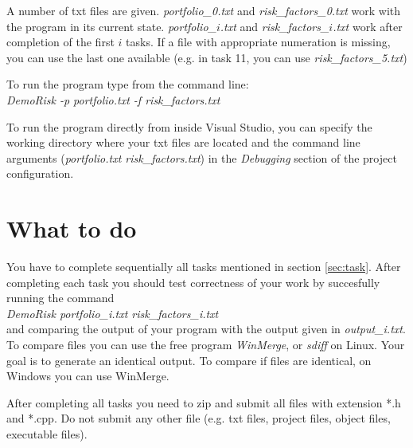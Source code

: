 \documentclass[10pt]{article}
\begin{document}
A number of txt files are given. \textit{portfolio\_0.txt} and \textit{risk\_factors\_0.txt} work with the program in its current state. \textit{portfolio\_$i$.txt} and \textit{risk\_factors\_$i$.txt} work after completion of the first $i$ tasks. If a file with appropriate numeration is missing, you can use the last one available (e.g. in task 11, you can use \textit{risk\_factors\_5.txt})

To run the program type from the command line:\\
\textit{DemoRisk -p portfolio.txt -f risk\_factors.txt}

To run the program directly from inside Visual Studio, you can specify the working directory where your txt files are located and the command line arguments (\textit{portfolio.txt risk\_factors.txt}) in the \textit{Debugging} section of the project configuration.

\section{What to do}
You have to complete sequentially all tasks mentioned in section \ref{sec:task}. After completing each task you should test correctness of your work by succesfully running the command \\
\textit{DemoRisk portfolio\_i.txt risk\_factors\_i.txt}\\
and comparing the output of your program with the output given in \textit{output\_i.txt}.
To compare files you can use the free program \textit{WinMerge}, or \textit{sdiff} on Linux. Your goal is to generate an identical output. To compare if files are identical, on Windows you can use WinMerge.

After completing all tasks you need to zip and submit all files with extension *.h and *.cpp. Do not submit any other file (e.g. txt files, project files, object files, executable files).
\end{document}
